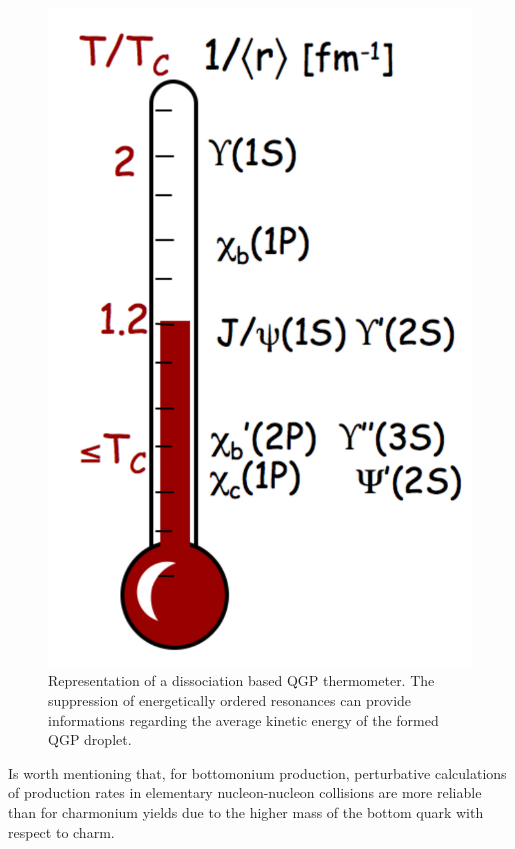 

\begin{figure}[!t]
\begin{center}
\includegraphics[width=0.3\linewidth]{Chapters/Introduction/Figs/thermometer.pdf}
\caption{Representation of a dissociation based QGP thermometer. The suppression of energetically ordered resonances can provide informations regarding the average kinetic energy of the formed QGP droplet.}
\label{fig:QGP_thermo}
\end{center}
\end{figure}

Is worth mentioning that, for bottomonium production, perturbative calculations of production rates in elementary nucleon-nucleon collisions are more reliable than for charmonium yields due to the higher mass of the bottom quark with respect to charm. 

